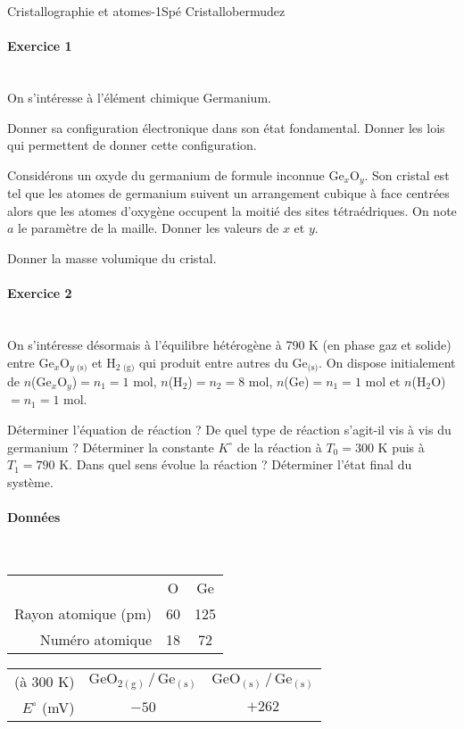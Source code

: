 \begin{exercise}{Cristallographie et atomes}{-1}{Spé}
{Cristallo}{bermudez}

\paragraph{Exercice 1}~\\
On s'intéresse à l'élément chimique Germanium.

\begin{questions}

    \question  Donner sa configuration électronique dans son état fondamental. Donner les lois qui permettent de donner cette configuration.
    
    \question Considérons un oxyde du germanium de formule inconnue Ge$_x$O$_y$. Son cristal est tel que les atomes de germanium suivent un arrangement cubique à face centrées alors que les atomes d'oxygène occupent la moitié des sites tétraédriques. On note $a$ le paramètre de la maille.
    Donner les valeurs de $x$ et $y$.

    \question Donner la masse volumique du cristal.
\end{questions}

\paragraph{Exercice 2}~\\
 On s'intéresse désormais à l'équilibre hétérogène à 790 K (en phase gaz et solide) entre Ge$_x$O$_{y\text{ (s)}}$ et H$_{2\text{ (g)}}$ qui produit entre autres du Ge$_\text{(s)}$.
 On dispose initialement de $n$(Ge$_x$O$_y$)$=n_1=1$ mol, $n$(H$_2$)$=n_2=8$ mol, $n$(Ge)$=n_1=1$ mol et $n$(H$_2$O)$=n_1=1$ mol.
 \begin{questions}
    \question Déterminer l'équation de réaction ? De quel type de réaction s'agit-il vis à vis du germanium ?
    \question Déterminer la constante $K^\circ$ de la réaction à $T_0 = 300$ K puis à $T_1 = 790$ K. 
    \question Dans quel sens évolue la réaction ?
    \question Déterminer l'état final du système.
\end{questions}

\paragraph{Données}
\begin{center}
~\hfill\begin{tabular}{rcc}
    \hline
     & O & Ge \\
    Rayon atomique (pm) & 60 & 125\\
    Numéro atomique & 18 & 72 \\ \hline\hline 
\end{tabular}\hfill\begin{tabular}{rcc}
    \hline
    (à 300 K) & $\mathrm{GeO_{2 (g)} \,/\, Ge_{(s)}}$ & $\mathrm{GeO_{(s)} \,/\, Ge_{(s)}}$ \\
    $E^\circ$ (mV) & $-50$ & $+262$\\ \hline\hline 
\end{tabular}\hfill~\\


\end{center}
\end{exercise}
